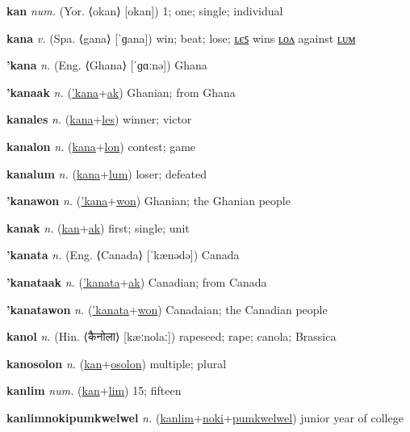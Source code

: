 \textbf{\hypertarget{kan}{kan}} \textit{num.} (Yor. ⟨okan⟩ [okan])
1; one; single; individual

\textbf{\hypertarget{kana}{kana}} \textit{v.} (Spa. ⟨gana⟩ [ˈɡana])
win; beat; lose; \hyperlink{kanales}{ʟєꜱ} wins \hyperlink{kanalon}{ʟᴏᴧ} against \hyperlink{kanalum}{ʟᴜᴍ}

\textbf{\hypertarget{'kana}{'kana}} \textit{n.} (Eng. ⟨Ghana⟩ [ˈɡɑːnə])
Ghana

\textbf{\hypertarget{'kanaak}{'kanaak}} \textit{n.} (\hyperlink{'kana}{'kana}+\allowbreak \hyperlink{ak}{ak})
Ghanian; from Ghana

\textbf{\hypertarget{kanales}{kanales}} \textit{n.} (\hyperlink{kana}{kana}+\allowbreak \hyperlink{les}{les})
winner; victor

\textbf{\hypertarget{kanalon}{kanalon}} \textit{n.} (\hyperlink{kana}{kana}+\allowbreak \hyperlink{lon}{lon})
contest; game

\textbf{\hypertarget{kanalum}{kanalum}} \textit{n.} (\hyperlink{kana}{kana}+\allowbreak \hyperlink{lum}{lum})
loser; defeated

\textbf{\hypertarget{'kanawon}{'kanawon}} \textit{n.} (\hyperlink{'kana}{'kana}+\allowbreak \hyperlink{won}{won})
Ghanian; the Ghanian people

\textbf{\hypertarget{kanak}{kanak}} \textit{n.} (\hyperlink{kan}{kan}+\allowbreak \hyperlink{ak}{ak})
first; single; unit

\textbf{\hypertarget{'kanata}{'kanata}} \textit{n.} (Eng. ⟨Canada⟩ [ˈkænədə])
Canada

\textbf{\hypertarget{'kanataak}{'kanataak}} \textit{n.} (\hyperlink{'kanata}{'kanata}+\allowbreak \hyperlink{ak}{ak})
Canadian; from Canada

\textbf{\hypertarget{'kanatawon}{'kanatawon}} \textit{n.} (\hyperlink{'kanata}{'kanata}+\allowbreak \hyperlink{won}{won})
Canadaian; the Canadian people

\textbf{\hypertarget{kanol}{kanol}} \textit{n.} (Hin. ⟨{\devanagari{}कैनोला}⟩ [kæːnolaː])
rapeseed; rape; canola; Brassica

\textbf{\hypertarget{kanosolon}{kanosolon}} \textit{n.} (\hyperlink{kan}{kan}+\allowbreak \hyperlink{osolon}{osolon})
multiple; plural

\textbf{\hypertarget{kanlim}{kanlim}} \textit{num.} (\hyperlink{kan}{kan}+\allowbreak \hyperlink{lim}{lim})
15; fifteen

\textbf{\hypertarget{kanlimnokipumkwelwel}{kanlimnokipumkwelwel}} \textit{n.} (\hyperlink{kanlim}{kanlim}+\allowbreak \hyperlink{noki}{noki}+\allowbreak \hyperlink{pumkwelwel}{pumkwelwel})
junior year of college

